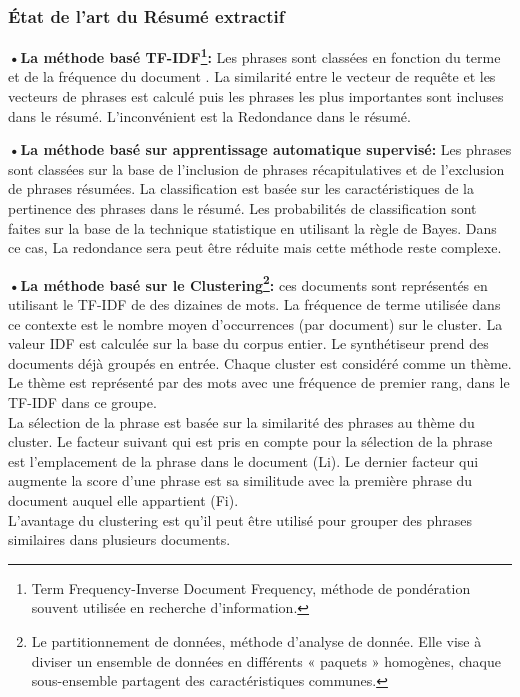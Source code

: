         \subsubsection{État de l'art du Résumé extractif}
        \textbf{•La méthode basé TF-IDF\footnote{Term Frequency-Inverse Document Frequency, méthode de pondération souvent utilisée en recherche d'information.}:}
            Les phrases sont classées en fonction du terme et de la fréquence du document \cite{tfidf}. La similarité entre le vecteur de requête et les vecteurs de phrases est calculé puis les phrases les plus importantes sont incluses dans le résumé. L'inconvénient est  la Redondance dans le résumé.\cite{surveysummarization}
            
        \textbf{•La méthode basé sur apprentissage automatique supervisé:} Les phrases sont classées sur la base de l'inclusion de phrases récapitulatives et de l'exclusion de phrases résumées. La classification est basée sur les caractéristiques de la pertinence des phrases dans le résumé. Les probabilités de classification sont faites sur la base de la technique statistique en utilisant la règle de Bayes. Dans ce cas, La redondance sera peut être réduite mais cette méthode reste complexe.\cite{surveysummarization}
            
        \textbf{•La méthode basé sur le Clustering\footnote{Le partitionnement de données, méthode d'analyse de donnée. Elle vise à diviser un ensemble de données en différents « paquets » homogènes, chaque sous-ensemble partagent des caractéristiques communes.}:} ces documents sont représentés en utilisant le TF-IDF de des dizaines de mots. La fréquence de terme utilisée dans ce contexte est le nombre moyen d'occurrences (par document) sur le cluster. La valeur IDF est calculée sur la base du corpus entier. Le synthétiseur prend des documents déjà groupés en entrée. Chaque cluster est considéré comme un thème.
            Le thème est représenté par des mots avec une fréquence de premier rang, dans le TF-IDF dans ce groupe.\\
            La sélection de la phrase est basée sur la similarité des phrases au thème du cluster. Le facteur suivant qui est pris en compte pour la sélection de la phrase est l'emplacement de la phrase dans le document (Li). Le dernier facteur qui augmente la score d'une phrase est sa similitude avec la première phrase du document auquel elle appartient
            (Fi).\\
            L'avantage du clustering est qu'il peut être utilisé pour grouper des phrases similaires dans plusieurs documents.\cite{surveysummarization}
            
